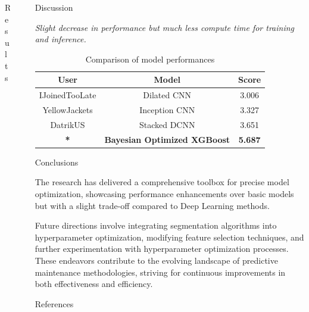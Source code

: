 \documentclass[final, 12pt]{beamer}
\newlength{\sepwidth}
\newlength{\colwidth}
\newlength{\smallcolwidth}
\newlength{\bigcolwidth}
\newcommand{\separatorcolumn}{\begin{column}{\sepwidth}\end{column}}
\begin{document}
\begin{frame}[t]
\begin{columns}[t]
\begin{column}{\bigcolwidth}
\begin{block}{Results}
    \end{block}

\end{column}

\separatorcolumn

\begin{column}{\smallcolwidth}

    \begin{block}{Discussion}

        \textit{Slight decrease in performance but much less compute time for training and inference.}
        \begin{table}
            \centering
            \begin{tabular}{ ccc }
                \toprule
                User & Model & Score \\
                \midrule
                IJoinedTooLate \cite{phm2021-1st-cnn} & Dilated CNN & 3.006 \\
                YellowJackets \cite{phm2021-2nd-inception} & Inception CNN & 3.327 \\
                DatrikUS \cite{phm2021-3rd-stacked-cnn} & Stacked DCNN & 3.651 \\
                \textbf{*} & \textbf{Bayesian Optimized XGBoost} & \textbf{5.687} \\
                \bottomrule
            \end{tabular}
            \caption{Comparison of model performances}
        \end{table}

    \end{block}

    \begin{block}{Conclusions}

        The research has delivered a comprehensive toolbox for precise model optimization, showcasing performance enhancements over basic models but with a slight trade-off compared to Deep Learning methods.

        Future directions involve integrating segmentation algorithms into hyperparameter optimization, modifying feature selection techniques, and further experimentation with hyperparameter optimization processes. These endeavors contribute to the evolving landscape of predictive maintenance methodologies, striving for continuous improvements in both effectiveness and efficiency.

    \end{block}


    \begin{block}{References}


\end{block}
\end{column}
\end{columns}
\end{frame}
\end{document}

